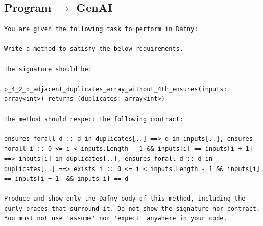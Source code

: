 \documentclass{article}
\begin{document}
\subsection*{Program $\rightarrow$ GenAI}
\begin{lstlisting}
You are given the following task to perform in Dafny:

Write a method to satisfy the below requirements.

The signature should be:

p_4_2_d_adjacent_duplicates_array_without_4th_ensures(inputs: array<int>) returns (duplicates: array<int>)

The method should respect the following contract:

ensures forall d :: d in duplicates[..] ==> d in inputs[..], ensures forall i :: 0 <= i < inputs.Length - 1 && inputs[i] == inputs[i + 1] ==> inputs[i] in duplicates[..], ensures forall d :: d in duplicates[..] ==> exists i :: 0 <= i < inputs.Length - 1 && inputs[i] == inputs[i + 1] && inputs[i] == d

Produce and show only the Dafny body of this method, including the curly braces that surround it. Do not show the signature nor contract. You must not use 'assume' nor 'expect' anywhere in your code.
\end{lstlisting}
\end{document}
